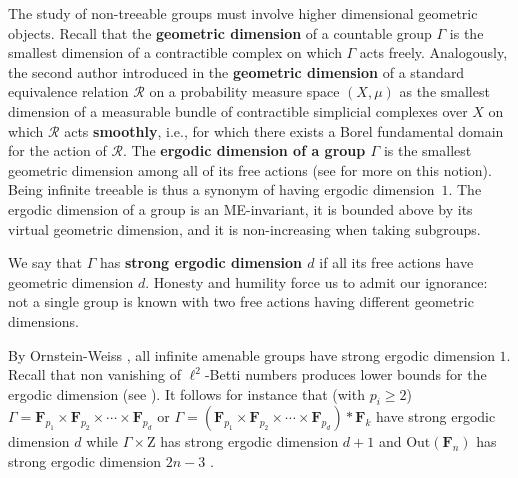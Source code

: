 \documentclass[11pt]{amsart}
\theoremstyle{definition}
\theoremstyle{plain}
\newcommand{\<}{\langle}
\renewcommand{\>}{\rangle}
\newcommand{\FF}{\mathbf{F}}
\newcommand{\Z}{\bm{\mathrm{Z}}}
\newcommand{\define}[1]{\textbf{#1}}
\newcommand{\pmp}{\text{p.m.p.}}
\newcommand\RR{\mathscr{R}}
\begin{document}
 The study of non-treeable groups must involve higher dimensional geometric objects.
Recall that the \define{geometric dimension} of a countable group $\Gamma$ is the smallest dimension of a contractible complex on which $\Gamma$ acts freely. Analogously,  the second author introduced in \cite[D\'ef. 3.18]{Gab02} the \define{geometric dimension} of a \pmp{} standard equivalence relation $\RR$ on a probability measure space $(X,\mu)$ as the smallest dimension of a measurable bundle of contractible simplicial complexes over $X$ on which $\RR$ acts \define{smoothly}, i.e., for which there exists a Borel fundamental domain for the action of $\RR$.
The \define{ergodic dimension of a group $\Gamma$} \cite[D\'ef. 6.4]{Gab02} is the smallest geometric dimension among all of its free \pmp{} actions  (see \cite{Gab-erg-dim} for more on this notion).
Being infinite treeable is thus a synonym of having ergodic dimension~$1$.
The ergodic dimension of a group is an ME-invariant, it is bounded above by its virtual geometric dimension, and it is non-increasing when taking subgroups.

We say that $\Gamma$ has \define{strong ergodic dimension $d$} if all its free \pmp{} actions
have geometric dimension $d$. Honesty and humility force us to admit our ignorance: not a single group is known with two free \pmp{} actions
having different geometric dimensions.

By Ornstein-Weiss \cite{OW80}, all infinite amenable groups have strong ergodic dimension $1$.
Recall that non vanishing of $\ell^2$-Betti numbers produces lower bounds for the ergodic dimension (see \cite[Prop. 5.8, Cor. 3.17]{Gab02}). It follows for instance that (with $p_i\geq 2$)  $\Gamma=\FF_{p_1}\times \FF_{p_2}\times \cdots \times \FF_{p_d}$ or $\Gamma=(\FF_{p_1}\times \FF_{p_2}\times \cdots \times \FF_{p_d})*  \FF_{k}$ have strong ergodic dimension $d$  \cite[pp. 126-127]{Gab02} while $\Gamma\times \Z$ has strong ergodic dimension $d+1$  and $\mathrm{Out}(\FF_n)$ has strong ergodic dimension $2n-3$
\cite[Theorem 1.6, Theorem 1.1]{Gab-top-dim}.
\end{document}
